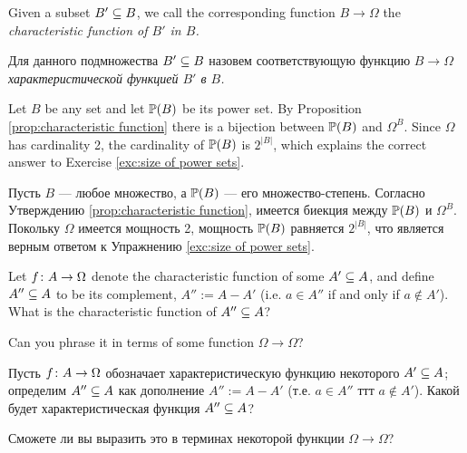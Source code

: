 \documentclass[CT4S-EN-RU]{subfiles}
\begin{document}
\begin{definitionENG}
Given a subset $B'\ss B$, we call the corresponding function $B\to\Omega$ the {\em characteristic function of $B'$ in $B$.}
\end{definitionENG}

\begin{definitionRUS}
Для данного подмножества $B'\ss B$ назовем соответствующую функцию $B\to\Omega$ {\em характеристической функцией $B'$ в $B$.}
\end{definitionRUS}

\begin{blockENG}
Let $B$ be any set and let $\PP(B)$ be its power set. By Proposition \ref{prop:characteristic function} there is a bijection between $\PP(B)$ and $\Omega^B$. Since $\Omega$ has cardinality 2, the cardinality of $\PP(B)$ is $2^{|B|}$, which explains the correct answer to Exercise \ref{exc:size of power sets}.
\end{blockENG}

\begin{blockRUS}
Пусть $B$ — любое множество, а $\PP(B)$ — его множество-степень. Согласно Утверждению \ref{prop:characteristic function}, имеется биекция между $\PP(B)$ и $\Omega^B$. Покольку $\Omega$ имеется мощность 2, мощность $\PP(B)$ равняется $2^{|B|}$, что является верным ответом к Упражнению \ref{exc:size of power sets}.
\end{blockRUS}

\begin{exerciseENG}
Let $f\taking A\to\Omega$ denote the characteristic function of some $A'\ss A$, and define $A''\ss A$ to be its complement, $A'':=A-A'$ (i.e. $a\in A''$ if and only if $a\not\in A'$). 
\sexc What is the characteristic function of $A''\ss A$? 
\item Can you phrase it in terms of some function $\Omega\to\Omega$?
\endsexc
\end{exerciseENG}

\begin{exerciseRUS}
Пусть $f\taking A\to\Omega$ обозначает характеристическую функцию некоторого $A'\ss A$; определим $A''\ss A$ как дополнение $A'':=A-A'$ (т.е. $a\in A''$ ттт $a\not\in A'$). 
\sexc Какой будет характеристическая функция $A''\ss A$? 
\item Сможете ли вы выразить это в терминах некоторой функции $\Omega\to\Omega$?
\endsexc
\end{exerciseRUS}
\end{document}
